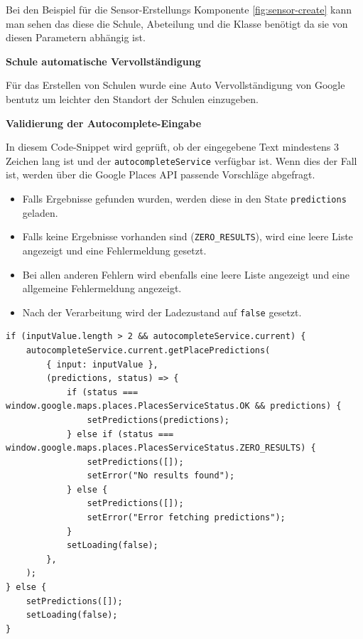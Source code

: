 \begin{inhalt}
\begin{enumerate}[label=\textbf{\arabic*.}]
Bei den Beispiel für die Sensor-Erstellungs Komponente \ref{fig:sensor-create} kann man sehen das diese die Schule, Abeteilung und die Klasse benötigt da sie von diesen Parametern abhängig ist.

\newpage

\textbf{Schule automatische Vervollständigung}

Für das Erstellen von Schulen wurde eine Auto Vervollständigung von Google bentutz um leichter den Standort der Schulen einzugeben.

\textbf{Validierung der Autocomplete-Eingabe}

In diesem Code-Snippet wird geprüft, ob der eingegebene Text mindestens 3 Zeichen lang ist und der \texttt{autocompleteService} verfügbar ist. Wenn dies der Fall ist, werden über die Google Places API passende Vorschläge abgefragt.

\begin{itemize}
    \item Falls Ergebnisse gefunden wurden, werden diese in den State \texttt{predictions} geladen.
    \item Falls keine Ergebnisse vorhanden sind (\texttt{ZERO\_RESULTS}), wird eine leere Liste angezeigt und eine Fehlermeldung gesetzt.
    \item Bei allen anderen Fehlern wird ebenfalls eine leere Liste angezeigt und eine allgemeine Fehlermeldung angezeigt.
    \item Nach der Verarbeitung wird der Ladezustand auf \texttt{false} gesetzt.
\end{itemize}

\vspace{0.5cm}

\begin{lstlisting}[language=mytsx]
if (inputValue.length > 2 && autocompleteService.current) {
    autocompleteService.current.getPlacePredictions(
        { input: inputValue },
        (predictions, status) => {
            if (status === window.google.maps.places.PlacesServiceStatus.OK && predictions) {
                setPredictions(predictions);
            } else if (status === window.google.maps.places.PlacesServiceStatus.ZERO_RESULTS) {
                setPredictions([]);
                setError("No results found");
            } else {
                setPredictions([]);
                setError("Error fetching predictions");
            }
            setLoading(false);
        },
    );
} else {
    setPredictions([]);
    setLoading(false);
}
\end{lstlisting}


\end{enumerate}
\end{inhalt}
